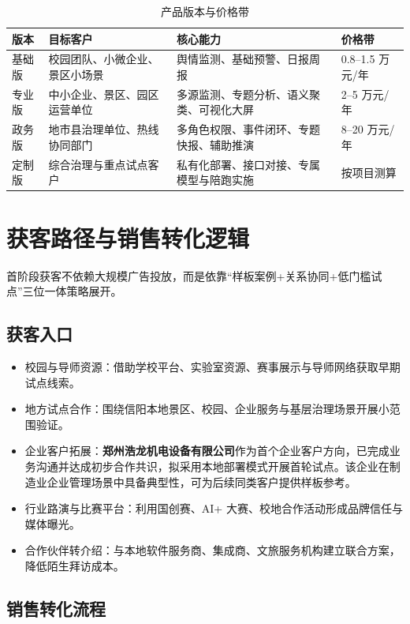 \begin{table}[htbp]
	\centering
	\caption{产品版本与价格带}
	\begin{tabularx}{\textwidth}{L{2.3cm}L{2.6cm}Y L{2.4cm}}
		\toprule
		版本  & 目标客户            & 核心能力                 & 价格带           \\
		\midrule
		基础版 & 校园团队、小微企业、景区小场景 & 舆情监测、基础预警、日报周报       & 0.8--1.5 万元/年 \\
		专业版 & 中小企业、景区、园区运营单位  & 多源监测、专题分析、语义聚类、可视化大屏 & 2--5 万元/年     \\
		政务版 & 地市县治理单位、热线协同部门  & 多角色权限、事件闭环、专题快报、辅助推演 & 8--20 万元/年    \\
		定制版 & 综合治理与重点试点客户     & 私有化部署、接口对接、专属模型与陪跑实施 & 按项目测算         \\
		\bottomrule
	\end{tabularx}
\end{table}

\section{获客路径与销售转化逻辑}

首阶段获客不依赖大规模广告投放，而是依靠“样板案例+关系协同+低门槛试点”三位一体策略展开。

\subsection{获客入口}

\begin{itemize}[leftmargin=2em]
	\item 校园与导师资源：借助学校平台、实验室资源、赛事展示与导师网络获取早期试点线索。
	\item 地方试点合作：围绕信阳本地景区、校园、企业服务与基层治理场景开展小范围验证。
	\item 企业客户拓展：\textbf{郑州浩龙机电设备有限公司}作为首个企业客户方向，已完成业务沟通并达成初步合作共识，拟采用本地部署模式开展首轮试点。该企业在制造业企业管理场景中具备典型性，可为后续同类客户提供样板参考。
	\item 行业路演与比赛平台：利用国创赛、AI+ 大赛、校地合作活动形成品牌信任与媒体曝光。
	\item 合作伙伴转介绍：与本地软件服务商、集成商、文旅服务机构建立联合方案，降低陌生拜访成本。
\end{itemize}

\subsection{销售转化流程}

